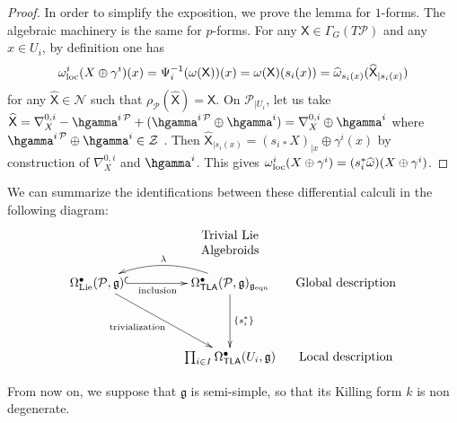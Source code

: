 \documentclass[number]{elsarticle}
\theoremstyle{definition}
\theoremstyle{remark}
\numberwithin{equation}{section}
\begin{document}
\begin{proof}
In order to simplify the exposition, we prove the lemma for $1$-forms. The algebraic machinery is the same for $p$-forms. For any ${{\mathsf X}} \in \Gamma_G(T{{{{\mathcal{{P}}}}}})$ and any $x \in U_i$, by definition one has
\begin{equation*}
\omega_{{\text{\textup{loc}}}}^i (X \oplus \gamma^i)(x) 
= \Psi_{i}^{-1} (\omega({{\mathsf X}}))(x) 
= \omega({{\mathsf X}})(s_i(x))
= {\widehat{\omega}}_{s_i(x)}( {{\widehat{\mathsf{X}}}}_{|s_i(x)})
\end{equation*}
for any ${{\widehat{\mathsf{X}}}} \in {{\mathcal N}}$ such that $\rho_{{{{\mathcal{{P}}}}}}({{\widehat{\mathsf{X}}}}) = {{\mathsf X}}$. On ${{{{\mathcal{{P}}}}}}_{|U_i}$, let us take ${{\widehat{\mathsf{X}}}} = \nabla^{0, i}_{X} - \hgamma^{i\,{{{{\mathcal{{P}}}}}}} + (\hgamma^{i\,{{{{\mathcal{{P}}}}}}} \oplus \hgamma^{i}) = \nabla^{0, i}_{X} \oplus \hgamma^{i}$ where $\hgamma^{i\,{{{{\mathcal{{P}}}}}}} \oplus \hgamma^{i} \in {{\mathcal Z}}$ \cite{Mass38}. Then ${{\widehat{\mathsf{X}}}}_{|s_i(x)} = (s_{i\, \ast} X)_{|x} \oplus \gamma^i(x)$ by construction of $\nabla^{0, i}_{X}$ and $\hgamma^i$. This gives $\omega_{{\text{\textup{loc}}}}^i (X \oplus \gamma^i) = (s_i^\ast {\widehat{\omega}})(X \oplus \gamma^i)$.
\end{proof}

We can summarize the identifications between these differential calculi in the following diagram:
\begin{equation*}
\xymatrix@R=10pt@C=10pt{
 & & & {\text{\parbox{5em}{\centering Trivial Lie\\ Algebroids}}} & \\
{\Omega^{\bullet}_{{\text{\textup{Lie}}}}({{{{\mathcal{{P}}}}}}, {{\mathfrak g}})} \ar@{^{(}->}[rrr]_-{\text{inclusion}} \ar[dddrrr]_(0.45)*!/^-3pt/{\text{\scriptsize trivialization}} 
& & & 
{\Omega^{\bullet}_{{{{\mathbf{\mathsf{{TLA}}}}}}}({{{{\mathcal{{P}}}}}},{{\mathfrak g}})_{{{\mathfrak g}}_{{\text{\textup{equ}}}}}} \ar[ddd]^-{\{ s_i^\ast\}} \ar@/_1.2pc/[lll]_-{\lambda}
& {\text{Global description}} \\
& & & & \\
& & & & \\
& & & {\prod_{i\in I} \Omega^{\bullet}_{{{{\mathbf{\mathsf{{TLA}}}}}}}(U_i,{{\mathfrak g}})} & {\text{Local description}}
}
\end{equation*}

\medskip
From now on, we suppose that ${{\mathfrak g}}$ is semi-simple, so that its Killing form $k$ is non degenerate.
\end{document}
